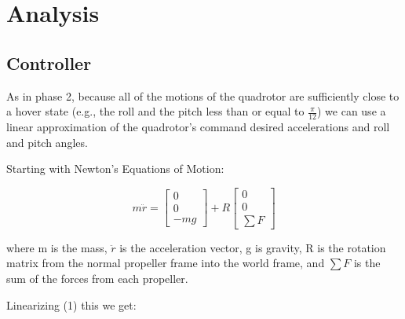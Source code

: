 \section{Analysis}
\subsection{Controller}

As in phase 2, because all of the motions of the quadrotor are sufficiently close to a hover state (e.g., the roll and the pitch less than or equal to $\frac{\pi}{12}$) we can use a linear approximation of the quadrotor’s command desired accelerations and roll and pitch angles.

Starting with Newton's Equations of Motion: 

\begin{equation}
m \ddot r=
\begin{bmatrix}
0 \\ 0 \\ -mg
\end{bmatrix} + R
\begin{bmatrix}
0 \\ 0 \\ \sum F
\end{bmatrix}
\end{equation}

where m is the mass, $\ddot r$ is the acceleration vector, g is gravity, R is the rotation matrix from the normal propeller frame into the world frame, and $\sum F$ is the sum of the forces from each propeller. 



Linearizing (1) this we get:

